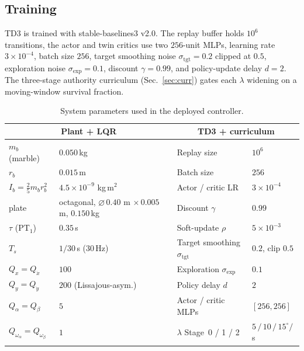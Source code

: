\documentclass[conference]{IEEEtran}
\begin{document}
\subsection{Training}
TD3 is trained with stable-baselines3 v2.0. The replay
buffer holds $10^6$ transitions, the actor and twin critics use two
$256$-unit MLPs, learning rate $3\times 10^{-4}$, batch size $256$, target
smoothing noise $\sigma_{\text{tgt}}=0.2$ clipped at $0.5$, exploration noise
$\sigma_{\text{exp}}=0.1$, discount $\gamma=0.99$, and policy-update delay
$d=2$. The three-stage authority curriculum (Sec.~\ref{sec:curr}) gates
each $\lambda$ widening on a moving-window survival fraction.

\begin{table}[t]
\centering
\caption{System parameters used in the deployed controller.}
\label{tab:hyper}
\renewcommand{\arraystretch}{1.05}
\setlength{\tabcolsep}{6pt}
\begin{tabular}{@{}l l@{\quad}|@{\quad}l l@{}}
\toprule
\multicolumn{2}{c}{\textbf{Plant + LQR}} & \multicolumn{2}{c}{\textbf{TD3 + curriculum}} \\
\midrule
$m_b$ (marble)            & $0.050\,$kg                   & Replay size              & $10^6$ \\
$r_b$                     & $0.015\,$m                    & Batch size               & $256$  \\
$I_b=\tfrac{2}{5}m_br_b^2$& $4.5\!\times\!10^{-9}$ kg$\,$m$^2$ & Actor / critic LR   & $3\!\times\!10^{-4}$ \\
plate                     & octagonal, $\varnothing\,0.40$ m $\times\,0.005$ m, $0.150\,$kg & Discount $\gamma$ & $0.99$ \\
$\tau$ (PT$_1$)           & $0.35\,$s                     & Soft-update $\rho$       & $5\!\times\!10^{-3}$ \\
$T_s$                     & $1/30\,$s ($30\,$Hz)         & Target smoothing $\sigma_\text{tgt}$ & $0.2$, clip $0.5$ \\
\midrule
$Q_x = Q_{\dot x}$        & $100$                         & Exploration $\sigma_\text{exp}$ & $0.1$ \\
$Q_y = Q_{\dot y}$        & $200$ (Lissajous-asym.)       & Policy delay $d$         & $2$ \\
$Q_\alpha = Q_\beta$      & $5$                           & Actor / critic MLPs      & $[256,256]$ \\
$Q_{\omega_\alpha} = Q_{\omega_\beta}$ & $1$              & $\lambda$ Stage~0 / 1 / 2 & $5\,/\,10\,/\,15^\circ\!/$s \\

\end{tabular}
\end{table}
\end{document}
